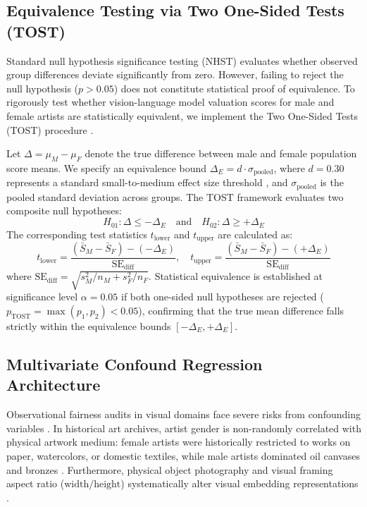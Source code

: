 \documentclass[pdflatex,sn-mathphys-num]{sn-jnl}%
\theoremstyle{thmstyleone}%
\theoremstyle{thmstyletwo}%
\theoremstyle{thmstylethree}%
\begin{document}
\subsection{Equivalence Testing via Two One-Sided Tests (TOST)}
Standard null hypothesis significance testing (NHST) evaluates whether observed group differences deviate significantly from zero. However, failing to reject the null hypothesis ($p > 0.05$) does not constitute statistical proof of equivalence. To rigorously test whether vision-language model valuation scores for male and female artists are statistically equivalent, we implement the Two One-Sided Tests (TOST) procedure \cite{lakens2017equivalence}.

Let $\Delta = \mu_M - \mu_F$ denote the true difference between male and female population score means. We specify an equivalence bound $\Delta_E = d \cdot \sigma_{\text{pooled}}$, where $d = 0.30$ represents a standard small-to-medium effect size threshold \cite{cohen1988statistical}, and $\sigma_{\text{pooled}}$ is the pooled standard deviation across groups. The TOST framework evaluates two composite null hypotheses:
\begin{equation}
H_{01}: \Delta \le -\Delta_E \quad \text{and} \quad H_{02}: \Delta \ge +\Delta_E
\end{equation}
The corresponding test statistics $t_{\text{lower}}$ and $t_{\text{upper}}$ are calculated as:
\begin{equation}
t_{\text{lower}} = \frac{(\bar{S}_M - \bar{S}_F) - (-\Delta_E)}{\text{SE}_{\text{diff}}}, \quad t_{\text{upper}} = \frac{(\bar{S}_M - \bar{S}_F) - (+\Delta_E)}{\text{SE}_{\text{diff}}}
\end{equation}
where $\text{SE}_{\text{diff}} = \sqrt{s_M^2/n_M + s_F^2/n_F}$. Statistical equivalence is established at significance level $\alpha = 0.05$ if both one-sided null hypotheses are rejected ($p_{\text{TOST}} = \max(p_1, p_2) < 0.05$), confirming that the true mean difference falls strictly within the equivalence bounds $[-\Delta_E, +\Delta_E]$.

\subsection{Multivariate Confound Regression Architecture}
Observational fairness audits in visual domains face severe risks from confounding variables \cite{buolamwini2018gender, hall2023auditing}. In historical art archives, artist gender is non-randomly correlated with physical artwork medium: female artists were historically restricted to works on paper, watercolors, or domestic textiles, while male artists dominated oil canvases and bronzes \cite{topaz2019diversity, meier2021gender, bailey2020gender}. Furthermore, physical object photography and visual framing aspect ratio ($\text{width}/\text{height}$) systematically alter visual embedding representations \cite{fiorucci2020machine, he2016deep}.
\end{document}
